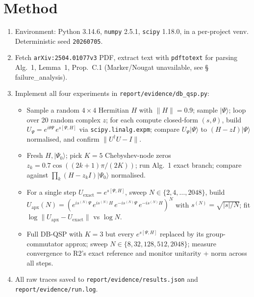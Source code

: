 \documentclass[11pt]{article}
\begin{document}
\section{Method}
\begin{enumerate}\itemsep2pt
\item Environment: Python 3.14.6, \texttt{numpy} 2.5.1, \texttt{scipy} 1.18.0, in a per-project venv. Deterministic seed \texttt{20260705}.
\item Fetch \texttt{arXiv:2504.01077v3} PDF, extract text with \texttt{pdftotext} for parsing Alg.~1, Lemma~1, Prop.~C.1 (Marker/Nougat unavailable, see \S\,failure\_analysis).
\item Implement all four experiments in \texttt{report/evidence/db\_qsp.py}:
  \begin{itemize}
  \item[\textbf{R1}] Sample a random $4\times 4$ Hermitian $H$ with $\lVert H\rVert = 0.9$; sample $\lvert\Psi\rangle$; loop over 20 random complex $z$; for each compute closed-form $(s,\theta)$, build $U_\Psi = e^{i\theta\Psi}\,e^{s[\Psi,H]}$ via \texttt{scipy.linalg.expm}; compare $U_\Psi\lvert\Psi\rangle$ to $(H-zI)\lvert\Psi\rangle$ normalised, and confirm $\lVert U^\dagger U - I\rVert$.
  \item[\textbf{R2}] Fresh $H,\lvert\Psi_0\rangle$; pick $K=5$ Chebyshev-node zeros $z_k = 0.7\cos((2k{+}1)\pi/(2K))$; run Alg.~1 exact branch; compare against $\prod_k (H - z_k I)\lvert\Psi_0\rangle$ normalised.
  \item[\textbf{R3}] For a single step $U_{\text{exact}} = e^{s[\Psi,H]}$, sweep $N \in \{2,4,\dots,2048\}$, build $U_{\text{apx}}(N) = (e^{i s^{(N)}\Psi}\,e^{i s^{(N)} H}\,e^{-i s^{(N)}\Psi}\,e^{-i s^{(N)} H})^N$ with $s^{(N)} = \sqrt{|s|/N}$; fit $\log \lVert U_{\text{apx}} - U_{\text{exact}}\rVert$ vs $\log N$.
  \item[\textbf{R4}] Full DB-QSP with $K=3$ but every $e^{s[\Psi,H]}$ replaced by its group-commutator approx; sweep $N\in\{8,32,128,512,2048\}$; measure convergence to R2's exact reference and monitor unitarity + norm across all steps.
  \end{itemize}
\item All raw traces saved to \texttt{report/evidence/results.json} and \texttt{report/evidence/run.log}.
\end{enumerate}
\end{document}
